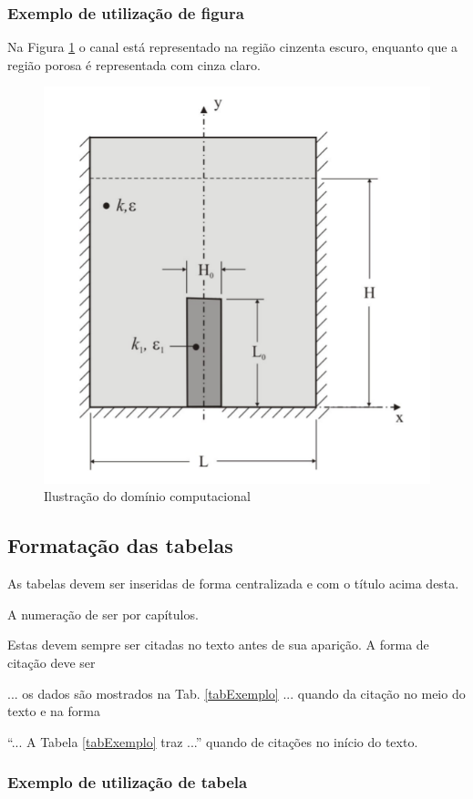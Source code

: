 \documentclass[a4paper,12pt,oneside]{article}
\numberwithin{equation}{section}
\begin{document}
 
\subsubsection{Exemplo de utilização de figura}

Na Figura \ref{figExemplo} o canal está representado na região cinzenta escuro, enquanto que a região
porosa é representada com cinza claro.


\begin{figure}[h]
\centering
\includegraphics[width=.7\linewidth]{img/dominio}
\caption{Ilustração do domínio computacional}
\label{figExemplo}
\end{figure}
	
	

\subsection{Formatação das tabelas}

As tabelas devem ser inseridas de forma centralizada e com o título acima desta.

A numeração de ser por capítulos.

Estas devem sempre ser citadas no texto antes de sua aparição. A forma de citação deve ser

... os dados são mostrados na Tab. \ref{tabExemplo} ... quando da citação no meio do texto e na forma 

“... A Tabela \ref{tabExemplo} traz ...” quando de citações no início do texto.

\subsubsection{Exemplo de utilização de tabela}
\end{document}
